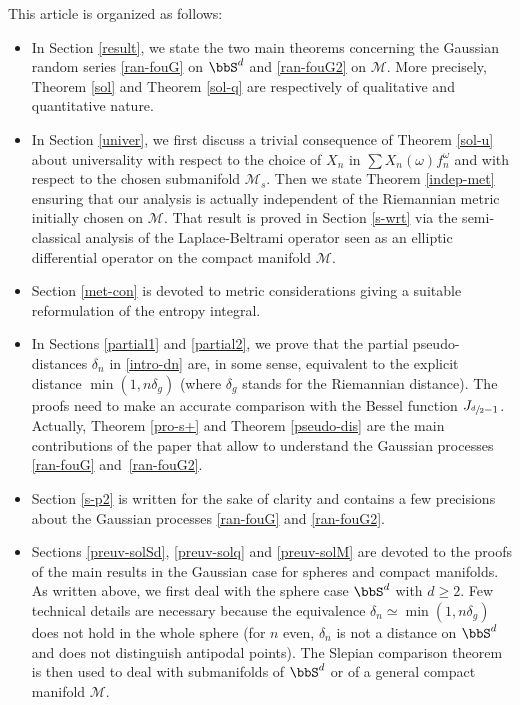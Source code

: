 This article is organized as follows:
\begin{itemize}
\item In Section \ref{result}, we state the two main theorems concerning the Gaussian random series \eqref{ran-fouG} on $\bbS^d$ and \eqref{ran-fouG2} on $\mathcal{M}$.
More precisely, Theorem \ref{sol} and Theorem \ref{sol-q} are respectively of qualitative and quantitative nature.
\item In Section \ref{univer}, we first discuss a trivial consequence of Theorem \ref{sol-u} about universality with respect to the choice of $X_n$ in $\sum X_n(\omega) f_n^\omega$ and with respect to the chosen submanifold $\mathcal{M}_s$.
Then we state Theorem \ref{indep-met} ensuring that our analysis is actually independent of the Riemannian metric initially chosen on $\mathcal{M}$. That result is proved in Section \ref{s-wrt} via the semi-classical analysis of the Laplace-Beltrami operator seen as an elliptic differential operator on the compact manifold $\mathcal{M}$.
\item Section \ref{met-con} is devoted to metric considerations giving a suitable reformulation of the entropy integral.
\item In Sections \ref{partial1} and \ref{partial2}, we prove that the partial pseudo-distances $\delta_n$ in \eqref{intro-dn} are, in some sense, equivalent to the explicit distance $\min(1,n\delta_g)$ (where $\delta_g$ stands for the Riemannian distance). The proofs need to make an accurate comparison with the Bessel function $J_{\sfrac{d}{2}-1}$. Actually, Theorem \ref{pro-s+} and Theorem \ref{pseudo-dis} are the main contributions of the paper that allow to understand the Gaussian processes \eqref{ran-fouG} and~\eqref{ran-fouG2}.
\item Section \ref{s-p2} is written for the sake of clarity and contains a few precisions about the Gaussian processes \eqref{ran-fouG} and \eqref{ran-fouG2}.
\item Sections \ref{preuv-solSd}, \ref{preuv-solq} and \ref{preuv-solM} are devoted to the proofs of the main results in the Gaussian case for spheres and compact manifolds.
As written above, we first deal with the sphere case $\bbS^d$ with $d\geq 2$. Few technical details are necessary because the equivalence $\delta_n\simeq \min(1,n\delta_g)$ does not hold in the whole sphere (for $n$ even, $\delta_n$ is not a distance on $\bbS^d$ and does not distinguish antipodal points). The Slepian comparison theorem is then used to deal with submanifolds of $\bbS^d$ or of a general compact manifold $\mathcal{M}$.

\end{itemize}
